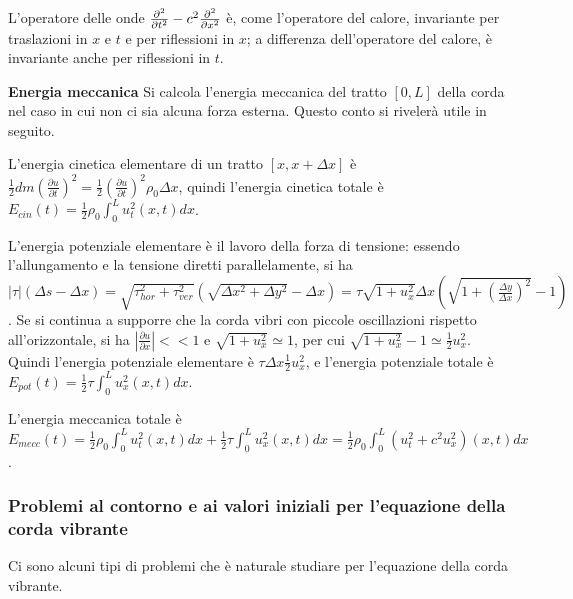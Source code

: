 \documentclass{article}
\begin{document}
L'operatore delle onde $\frac{\partial ^{2}}{\partial t^{2}}-c^{2}\frac{%
\partial ^{2}}{\partial x^{2}}$ \`{e}, come l'operatore del calore,
invariante per traslazioni in $x$ e $t$ e per riflessioni in $x$; a
differenza dell'operatore del calore, \`{e} invariante anche per riflessioni
in $t$.

\textbf{Energia meccanica} Si calcola l'energia meccanica del tratto $\left[
0,L\right] $ della corda nel caso in cui non ci sia alcuna forza esterna.
Questo conto si riveler\`{a} utile in seguito.

L'energia cinetica elementare di un tratto $\left[ x,x+\Delta x\right] $ 
\`{e} $\frac{1}{2}dm\left( \frac{\partial u}{\partial t}\right) ^{2}=\frac{1%
}{2}\left( \frac{\partial u}{\partial t}\right) ^{2}\rho _{0}\Delta x$,
quindi l'energia cinetica totale \`{e} $E_{cin}\left( t\right) =\frac{1}{2}%
\rho _{0}\int_{0}^{L}u_{t}^{2}\left( x,t\right) dx$.

L'energia potenziale elementare \`{e} il lavoro della forza di tensione:
essendo l'allungamento e la tensione diretti parallelamente, si ha $%
\left\vert \tau \right\vert \left( \Delta s-\Delta x\right) =\sqrt{\tau
_{hor}^{2}+\tau _{ver}^{2}}\left( \sqrt{\Delta x^{2}+\Delta y^{2}}-\Delta
x\right) =\tau \sqrt{1+u_{x}^{2}}\Delta x\left( \sqrt{1+\left( \frac{\Delta y%
}{\Delta x}\right) ^{2}}-1\right) $. Se si continua a supporre che la corda
vibri con piccole oscillazioni rispetto all'orizzontale, si ha $\left\vert 
\frac{\partial u}{\partial x}\right\vert <<1$ e $\sqrt{1+u_{x}^{2}}%
\simeq 1$, per cui $\sqrt{1+u_{x}^{2}}-1\simeq \frac{1}{2}u_{x}^{2}$. Quindi
l'energia potenziale elementare \`{e} $\tau \Delta x\frac{1}{2}u_{x}^{2}$, e
l'energia potenziale totale \`{e} $E_{pot}\left( t\right) =\frac{1}{2}\tau
\int_{0}^{L}u_{x}^{2}\left( x,t\right) dx$.

L'energia meccanica totale \`{e} $E_{mecc}\left( t\right) =\frac{1}{2}\rho
_{0}\int_{0}^{L}u_{t}^{2}\left( x,t\right) dx+\frac{1}{2}\tau
\int_{0}^{L}u_{x}^{2}\left( x,t\right) dx=\frac{1}{2}\rho
_{0}\int_{0}^{L}\left( u_{t}^{2}+c^{2}u_{x}^{2}\right) \left( x,t\right) dx$.

\subsubsection{Problemi al contorno e ai valori iniziali per l'equazione
della corda vibrante}

Ci sono alcuni tipi di problemi che \`{e} naturale studiare per l'equazione
della corda vibrante.
\end{document}
